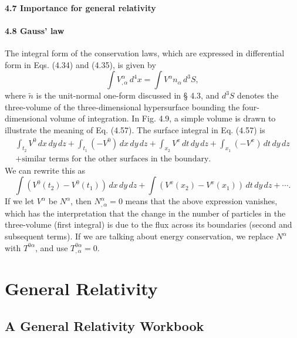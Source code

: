 \documentclass[12pt]{book}
\begin{document}
    \subsection{4.7 Importance for general relativity}
    
    \subsection{4.8 Gauss' law}

    The integral form of the conservation laws, which are expressed in differential form in Eqs. (4.34) and (4.35), is given by
    \[
    \int V^\alpha_{,\alpha} \, d^4x = \int V^\alpha n_\alpha \, d^3 S, \tag{4.57}
    \]
    where \(\tilde{n}\) is the unit-normal one-form discussed in § 4.3, and \(d^3 S\) denotes the three-volume of the three-dimensional hypersurface bounding the four-dimensional volume of integration. In Fig. 4.9, a simple volume is drawn to illustrate the meaning of Eq. (4.57). The surface integral in Eq. (4.57) is
    \begin{align}
    \int_{t_2} V^0 \, dx \, dy \, dz + \int_{t_1} (-V^0) \, dx \, dy \, dz + \int_{x_2} V^x \, dt \, dy \, dz + \int_{x_1} (-V^x) \, dt \, dy \, dz
    \\
    + \text{similar terms for the other surfaces in the boundary}.
    \end{align}
    We can rewrite this as
    \[
    \int \left( V^0(t_2) - V^0(t_1) \right) \, dx \, dy \, dz + \int \left( V^x(x_2) - V^x(x_1) \right) \, dt \, dy \, dz + \cdots. \tag{4.58}
    \]
    If we let \(V^\alpha\) be \(N^\alpha\), then \(N^\alpha_{,\alpha} = 0\) means that the above expression vanishes, which has the interpretation that the change in the number of particles in the three-volume (first integral) is due to the flux across its boundaries (second and subsequent terms). If we are talking about energy conservation, we replace \(N^\alpha\) with \(T^{0\alpha}\), and use \(T^{0\alpha}_{,\alpha} = 0\).
    
    
\part{General Relativity}



\chapter{A General Relativity Workbook}
\end{document}

